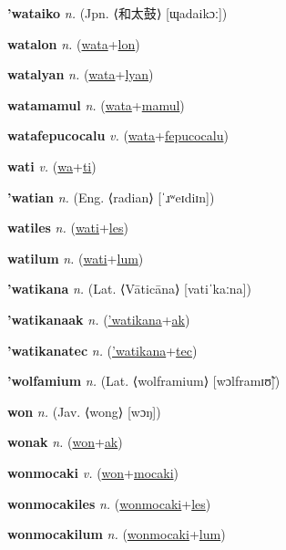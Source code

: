 \textbf{\hypertarget{'wataiko}{'wataiko}} \textit{n.} (Jpn. ⟨{\japanese{}和太鼓}⟩ [ɰadaikɔː])


\textbf{\hypertarget{watalon}{watalon}} \textit{n.} (\hyperlink{wata}{wata}+\allowbreak \hyperlink{lon}{lon})


\textbf{\hypertarget{watalyan}{watalyan}} \textit{n.} (\hyperlink{wata}{wata}+\allowbreak \hyperlink{lyan}{lyan})


\textbf{\hypertarget{watamamul}{watamamul}} \textit{n.} (\hyperlink{wata}{wata}+\allowbreak \hyperlink{mamul}{mamul})


\textbf{\hypertarget{watafepucocalu}{watafepucocalu}} \textit{v.} (\hyperlink{wata}{wata}+\allowbreak \hyperlink{fepucocalu}{fepucocalu})


\textbf{\hypertarget{wati}{wati}} \textit{v.} (\hyperlink{wa}{wa}+\allowbreak \hyperlink{ti}{ti})


\textbf{\hypertarget{'watian}{'watian}} \textit{n.} (Eng. ⟨radian⟩ [ˈɹʷeɪdiɪn])


\textbf{\hypertarget{watiles}{watiles}} \textit{n.} (\hyperlink{wati}{wati}+\allowbreak \hyperlink{les}{les})


\textbf{\hypertarget{watilum}{watilum}} \textit{n.} (\hyperlink{wati}{wati}+\allowbreak \hyperlink{lum}{lum})


\textbf{\hypertarget{'watikana}{'watikana}} \textit{n.} (Lat. ⟨Vāticāna⟩ [vatiˈkaːna])


\textbf{\hypertarget{'watikanaak}{'watikanaak}} \textit{n.} (\hyperlink{'watikana}{'watikana}+\allowbreak \hyperlink{ak}{ak})


\textbf{\hypertarget{'watikanatec}{'watikanatec}} \textit{n.} (\hyperlink{'watikana}{'watikana}+\allowbreak \hyperlink{tec}{tec})


\textbf{\hypertarget{'wolfamium}{'wolfamium}} \textit{n.} (Lat. ⟨wolframium⟩ [wɔlframɪʊ̃])


\textbf{\hypertarget{won}{won}} \textit{n.} (Jav. ⟨wong⟩ [wɔŋ])


\textbf{\hypertarget{wonak}{wonak}} \textit{n.} (\hyperlink{won}{won}+\allowbreak \hyperlink{ak}{ak})


\textbf{\hypertarget{wonmocaki}{wonmocaki}} \textit{v.} (\hyperlink{won}{won}+\allowbreak \hyperlink{mocaki}{mocaki})


\textbf{\hypertarget{wonmocakiles}{wonmocakiles}} \textit{n.} (\hyperlink{wonmocaki}{wonmocaki}+\allowbreak \hyperlink{les}{les})


\textbf{\hypertarget{wonmocakilum}{wonmocakilum}} \textit{n.} (\hyperlink{wonmocaki}{wonmocaki}+\allowbreak \hyperlink{lum}{lum})


